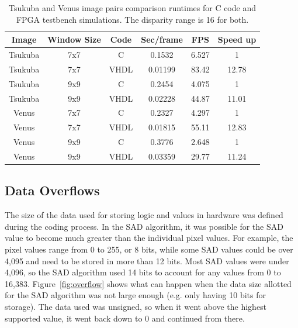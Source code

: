 \begin{table}
	\begin{center}
		\begin{tabu}{|c|c|c|c|c|c|}
			\hline
				\rowstyle{\bfseries} Image & 
				\rowstyle{\bfseries} Window Size & 
				\rowstyle{\bfseries} Code & 
				\rowstyle{\bfseries} Sec/frame & 
				\rowstyle{\bfseries} FPS &
				\rowstyle{\bfseries} Speed up
			\\ \hline 
			Tsukuba & 7x7 & C & 0.1532 & 6.527 & 1
			\\ \hline 
			Tsukuba & 7x7 & VHDL & 0.01199 & 83.42 & 12.78
			\\ \tabucline[2pt]{-}
			Tsukuba & 9x9 & C & 0.2454 & 4.075 & 1
			\\ \hline 
			Tsukuba & 9x9 & VHDL & 0.02228 & 44.87 & 11.01
			\\ \tabucline[2pt]{-}
			Venus & 7x7 & C & 0.2327 & 4.297 & 1
			\\ \hline 
			Venus & 7x7 & VHDL & 0.01815 & 55.11 & 12.83
			\\ \tabucline[2pt]{-}
			Venus & 9x9 & C & 0.3776 & 2.648 & 1
			\\ \hline 
			Venus & 9x9 & VHDL & 0.03359 & 29.77 & 11.24
			\\ \hline 
		\end{tabu}	
		\captionfonts
		\caption{Tsukuba and Venus image pairs comparison runtimes for C code and FPGA testbench simulations. The disparity range is 16 for both.}
		\label{table:runtimeComp}
	\end{center}
\end{table}

\subsection{Data Overflows}
\label{sec:overflow}

The size of the data used for storing logic and values in hardware was defined during the coding process. In the SAD algorithm, it was possible for the SAD value to become much greater than the individual pixel values. For example, the pixel values range from 0 to 255, or 8 bits, while some SAD values could be over 4,095 and need to be stored in more than 12 bits. Most SAD values were under 4,096, so the SAD algorithm used 14 bits to account for any values from 0 to 16,383. Figure~\ref{fig:overflow} shows what can happen when the data size allotted for the SAD algorithm was not large enough (e.g. only having 10 bits for storage). The data used was unsigned, so when it went above the highest supported value, it went back down to 0 and continued from there.

